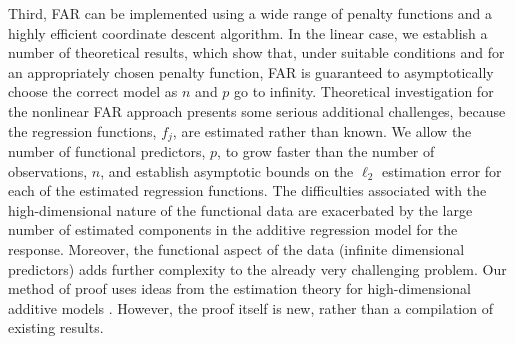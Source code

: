 \documentclass[aos,MSNbibl,dvips]{arximspdf}
\begin{document}
Third, FAR can be implemented using a wide range of penalty functions and
a highly efficient coordinate descent algorithm. In the linear case, we
establish a number of theoretical results, which show that, under suitable
conditions and for an appropriately chosen penalty function, FAR is
guaranteed to asymptotically choose the correct model as $n$ and $p$ go to
infinity. Theoretical investigation for the nonlinear FAR approach
presents some serious additional challenges, because the regression
functions, $f_j$, are estimated rather than known. We allow the number of
functional predictors, $p$, to grow faster than the number of
observations, $n$, and establish asymptotic bounds on the $\ell_2$
estimation error for each of the estimated regression functions. The
difficulties associated with the high-dimensional nature of the functional
data are exacerbated by the large number of estimated components in the
additive regression model for the response. Moreover, the functional
aspect of the data (infinite dimensional predictors) adds further
complexity to the already very challenging problem. Our method of proof
uses ideas from the estimation theory for high-dimensional additive models
\cite{Bbuhlmann1,huang1,meier1}. However, the proof itself is new, rather than a compilation
of existing results.


\end{document}
